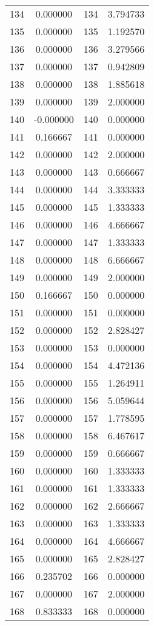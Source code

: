 \documentclass[12pt]{article}
\begin{document}
\begin{longtable}{@{}cccc@{}}
134 & 0.000000 & 134 & 3.794733 \\
135 & 0.000000 & 135 & 1.192570 \\
136 & 0.000000 & 136 & 3.279566 \\
137 & 0.000000 & 137 & 0.942809 \\
138 & 0.000000 & 138 & 1.885618 \\
139 & 0.000000 & 139 & 2.000000 \\
140 & -0.000000 & 140 & 0.000000 \\
141 & 0.166667 & 141 & 0.000000 \\
142 & 0.000000 & 142 & 2.000000 \\
143 & 0.000000 & 143 & 0.666667 \\
144 & 0.000000 & 144 & 3.333333 \\
145 & 0.000000 & 145 & 1.333333 \\
146 & 0.000000 & 146 & 4.666667 \\
147 & 0.000000 & 147 & 1.333333 \\
148 & 0.000000 & 148 & 6.666667 \\
149 & 0.000000 & 149 & 2.000000 \\
150 & 0.166667 & 150 & 0.000000 \\
151 & 0.000000 & 151 & 0.000000 \\
152 & 0.000000 & 152 & 2.828427 \\
153 & 0.000000 & 153 & 0.000000 \\
154 & 0.000000 & 154 & 4.472136 \\
155 & 0.000000 & 155 & 1.264911 \\
156 & 0.000000 & 156 & 5.059644 \\
157 & 0.000000 & 157 & 1.778595 \\
158 & 0.000000 & 158 & 6.467617 \\
159 & 0.000000 & 159 & 0.666667 \\
160 & 0.000000 & 160 & 1.333333 \\
161 & 0.000000 & 161 & 1.333333 \\
162 & 0.000000 & 162 & 2.666667 \\
163 & 0.000000 & 163 & 1.333333 \\
164 & 0.000000 & 164 & 4.666667 \\
165 & 0.000000 & 165 & 2.828427 \\
166 & 0.235702 & 166 & 0.000000 \\
167 & 0.000000 & 167 & 2.000000 \\
168 & 0.833333 & 168 & 0.000000 \\

\end{longtable}
\end{document}
